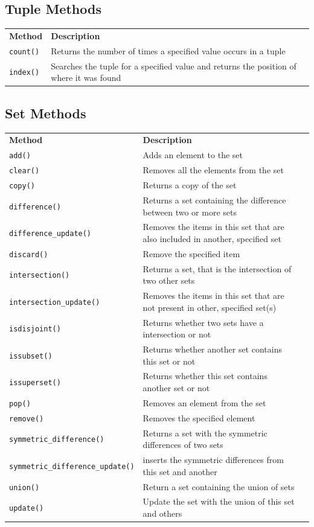 \documentclass[12pt,a4paper]{article}
\newcommand{\lcode}[1]{%
	\lstinline{#1}%
}
\newcommand{\tcol}[2]{%
	\quad #1 & #2 \\
}
\begin{document}
\subsection{Tuple Methods}\label{pyTupleMethod}

\begin{table}[h]
	\begin{center}
		\begin{tabularx}{\textwidth}{lXl}
\tcol{\textbf{Method}}{\textbf{Description}}
\tcol{\lcode{count()}}
	{Returns the number of times a specified value occurs in a tuple}
\tcol{\lcode{index()}}
	{Searches the tuple for a specified value and returns the position of where it was found}
		\end{tabularx}
	\end{center}
\end{table}
\subsection{Set Methods}\label{pySetMethod}

\begin{table}[h]
	\begin{center}
		\begin{tabularx}{\textwidth}{lXl}
\tcol{\textbf{Method}}{\textbf{Description}}
\tcol{\lcode{add()}}{Adds an element to the set}
\tcol{\lcode{clear()}}{Removes all the elements from the set}
\tcol{\lcode{copy()}}{Returns a copy of the set}
\tcol{\lcode{difference()}}{Returns a set containing the difference between two or more sets}
\tcol{\lcode{difference_update()}}{Removes the items in this set that are also included in another, specified set}
\tcol{\lcode{discard()}}{Remove the specified item}
\tcol{\lcode{intersection()}}{Returns a set, that is the intersection of two other sets}
\tcol{\lcode{intersection_update()}}{Removes the items in this set that are not present in other, specified set(s)}
\tcol{\lcode{isdisjoint()}}{Returns whether two sets have a intersection or not}
\tcol{\lcode{issubset()}}{Returns whether another set contains this set or not}
\tcol{\lcode{issuperset()}}{Returns whether this set contains another set or not}
\tcol{\lcode{pop()}}{Removes an element from the set}
\tcol{\lcode{remove()}}{Removes the specified element}
\tcol{\lcode{symmetric_difference()}}{Returns a set with the symmetric differences of two sets}
\tcol{\lcode{symmetric_difference_update()}}{inserts the symmetric differences from this set and another}
\tcol{\lcode{union()}}{Return a set containing the union of sets}
\tcol{\lcode{update()}}{Update the set with the union of this set and others}
		\end{tabularx}
	\end{center}
\end{table}
\vfill\newpage
\end{document}
